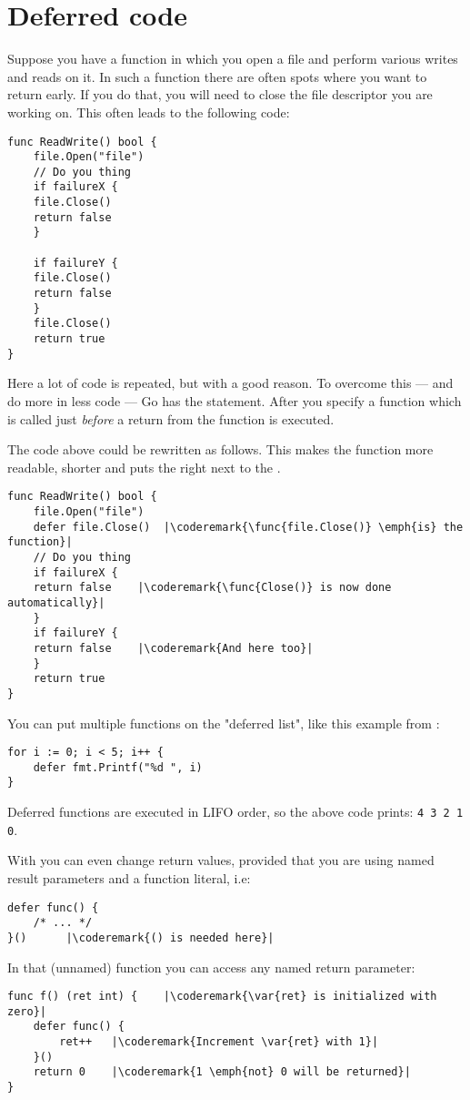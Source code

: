 \section{Deferred code}
Suppose you have a function in which you open a file and perform various
writes and reads on it. In such a function there are often spots where
you want to return early. If you do that, you will need to close the file
descriptor you are working on. This often leads to the following code:
\begin{lstlisting}[caption=Without \func{defer}]
func ReadWrite() bool {
    file.Open("file")
    // Do you thing
    if failureX {
	file.Close()
	return false
    }

    if failureY {
	file.Close()
	return false
    }
    file.Close()
    return true
}
\end{lstlisting}
Here a lot of code is repeated, but with a good reason. To overcome this ---
and do more in less code --- Go has the  statement. After
 you specify a function which is called just \emph{before} a
return from the function is executed.

The code above could be rewritten as follows. This makes the 
function more readable, shorter and puts the  right next 
to the .
\begin{lstlisting}[caption=With \func{defer}]
func ReadWrite() bool {
    file.Open("file")
    defer file.Close()	|\coderemark{\func{file.Close()} \emph{is} the function}|
    // Do you thing
    if failureX {
	return false    |\coderemark{\func{Close()} is now done automatically}|
    }
    if failureY {
	return false    |\coderemark{And here too}|
    }
    return true
}
\end{lstlisting}
You can put multiple functions on the "deferred list", like this
example from \cite{effective_go}:
\begin{lstlisting}
for i := 0; i < 5; i++ { 
    defer fmt.Printf("%d ", i) 
} 
\end{lstlisting}
Deferred functions are executed in LIFO order, so the above code
prints: \lstinline{4 3 2 1 0}. 

With  you can even change return values, provided that
you are using named result parameters and a function literal, i.e:
\begin{lstlisting}[caption=Function literal]
defer func() {
	/* ... */
}()		 |\coderemark{() is needed here}|
\end{lstlisting}
In that (unnamed) function you can access any named return
parameter:
\begin{lstlisting}[caption=Access return values within \func{defer}]
func f() (ret int) {    |\coderemark{\var{ret} is initialized with zero}|
	defer func() {
		ret++	|\coderemark{Increment \var{ret} with 1}|
	}()
	return 0	|\coderemark{1 \emph{not} 0 will be returned}|
}
\end{lstlisting}



